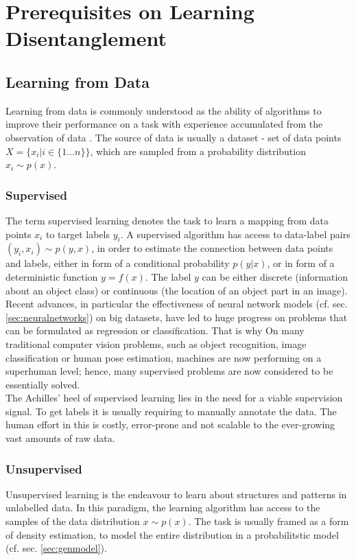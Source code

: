 \chapter{Prerequisites on Learning Disentanglement}

\section{Learning from Data}
	{Learning from data} is commonly understood as the ability of algorithms to improve their performance on a task with experience accumulated from the observation of data \cite{goodfellow16dlb}. The source of data is usually a dataset - set of data points $X = \{x_i | i \in \{1\ldots n\} \}$, which are sampled from a probability distribution $x_i \sim p(x)$.

	\subsection{Supervised}\label{sec:supervised}
		The term {supervised learning} denotes the task to learn a mapping from data points $x_i$ to target labels $y_i$.
		A supervised algorithm has access to data-label pairs  $(y_i, x_i) \sim p(y, x)$, in order to estimate the connection between data points and labels, either in form of a conditional probability $p(y|x)$, or in form of a deterministic function $y = f(x)$.
		The label $y$ can be either discrete (\eg information about an object class) or continuous (\eg the location of an object part in an image).
		Recent advances, in particular the effectiveness of neural network models (cf. sec. \ref{sec:neuralnetworks}) on big datasets, have led to huge progress on problems that can be formulated as regression or classification. That is why On many traditional computer vision problems, such as \eg object recognition, image classification or human pose estimation, machines are now performing on a superhuman level; hence, many supervised problems are now considered to be essentially solved.\\
		The Achilles' heel of supervised learning lies in the need for a viable supervision signal. To get labels it is usually requiring to manually annotate the data. The human effort in this is costly, error-prone and not scalable to the ever-growing vast amounts of raw data.

	\subsection{Unsupervised}\label{sec:unsupervised}
		{Unsupervised learning} is the endeavour to learn about structures and patterns in unlabelled data. In this paradigm, the learning algorithm has access to the samples of the data distribution $x \sim p(x)$. The task is usually framed as a form of density estimation, \ie to model the entire distribution in a probabilitstic model (cf. sec. \ref{sec:genmodel}).


